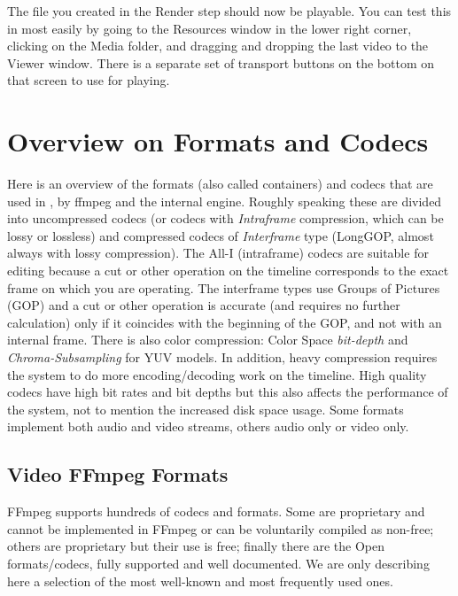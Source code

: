 The file you created in the Render step should now be playable.  You can test this in \CGG{} most easily by going to the Resources window in the lower right corner, clicking on the Media folder, and dragging and dropping the last video to the Viewer window.  There is a separate set of transport buttons on the bottom on that screen to use for playing.

\section{Overview on Formats and Codecs}%
\label{sec:overview_formats}

Here is an overview of the formats (also called containers) and codecs that are used in \CGG{}, by ffmpeg and the internal engine. Roughly speaking these are divided into uncompressed codecs (or codecs with \textit{Intraframe} compression, which can be lossy or lossless) and compressed codecs of \textit{Interframe} type (LongGOP, almost always with lossy compression). The All-I (intraframe) codecs are suitable for editing because a cut or other operation on the timeline corresponds to the exact frame on which you are operating. The interframe types use Groups of Pictures (GOP) and a cut or other operation is accurate (and requires no further calculation) only if it coincides with the beginning of the GOP, and not with an internal frame. There is also color compression: Color Space \textit{bit-depth} and \textit{Chroma-Subsampling} for YUV models. In addition, heavy compression requires the system to do more encoding/decoding work on the timeline. High quality codecs have high bit rates and bit depths but this also affects the performance of the system, not to mention the increased disk space usage. Some formats implement both audio and video streams, others audio only or video only.  

\subsection{Video FFmpeg Formats}%
\label{sec:FFmpeg_video}

FFmpeg supports hundreds of codecs and formats. Some are proprietary and cannot be implemented in FFmpeg or can be voluntarily compiled as non-free; others are proprietary but their use is free; finally there are the Open formats/codecs, fully supported and well documented. We are only describing here a selection of the most well-known and most frequently used ones.

